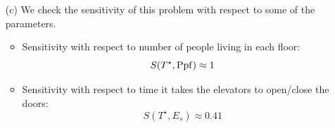 \begin{enumerate}
\hfill 


\begin{enumerate}
\item[(c)] We check the sensitivity of this problem with respect to some of the parameters.

\begin{itemize}
	\item Sensitivity with respect to number of people living in each floor:
		\[S(T^\star, {\rm Ppf}) \approx 1\]
	\item Sensitivity with respect to time it takes the elevators to open/close the doors:
		\[S(T^\star, E_s) \approx 0.41\]
\end{itemize}
\end{enumerate}




		
			
\end{enumerate}
	
